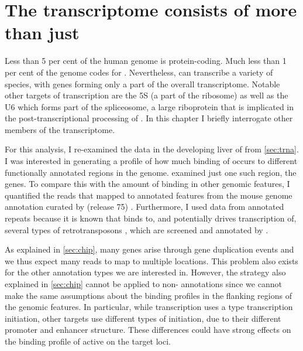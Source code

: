 \chapter{The  transcriptome consists of more than just }
\label{sec:pol3}

Less than \num{5} per cent of the human genome is protein-coding. Much less than
\num{1} per cent of the genome codes for \trna[s] \citep{Lander:2001}.
Nevertheless,  can transcribe a variety of \rna species, with \trna genes
forming only a part of the overall  transcriptome. Notable other targets of
 transcription are the 5S \rrna (a part of the ribosome) as well as the U6
\rna which forms part of the spliceosome, a large riboprotein that is
implicated in the post-transcriptional processing of \rna[s] \citep{White:1998}.
In this chapter I briefly interrogate other members of the  transcriptome.

For this analysis, I re-examined the \chipseq data in the developing liver of
\mmu from \cref{sec:trna}. I was interested in generating a profile of how much
binding of  occurs to different functionally annotated regions in the
genome.  examined just one such region, the \trna genes. To
compare this with the amount of binding in other genomic features, I quantified
the \chipseq reads that mapped to annotated features from the 
mouse genome annotation curated by  (release \num{75})
\citep{Flicek:2014}. Furthermore, I used data from annotated repeats because it
is known that  binds to, and potentially drives transcription of, several
types of retrotransposons \citep{Carriere:2012}, which are screened and
annotated by  \citep{Smit:2014}.

As explained in \cref{sec:chip}, many \trna genes arise through gene duplication
events and we thus expect many reads to map to multiple locations. This problem
also exists for the other annotation types we are interested in. However, the
strategy also explained in \cref{sec:chip} cannot be applied to non-\trna
annotations since we cannot make the same assumptions about the binding profiles
in the flanking regions of the genomic features. In particular, while \trna
transcription uses a type  transcription initiation, other 
targets use different types of initiation, due to their different promoter and
enhancer structure. These differences could have strong effects on the binding
profile of active  on the target loci.

